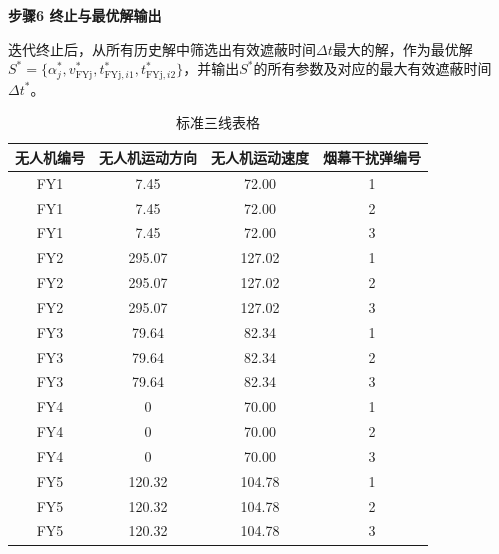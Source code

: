 \documentclass[../main.tex]{subfiles}
\begin{document}
\noindent\textbf{步骤6 终止与最优解输出}

迭代终止后，从所有历史解中筛选出有效遮蔽时间$\Delta t$最大的解，作为最优解$S^*=\{\alpha_j^*, v_{\text{FYj}}^*, t_{\text{FYj},i1}^*, t_{\text{FYj},i2}^*\}$，并输出$S^*$的所有参数及对应的最大有效遮蔽时间$\Delta t^*$。





\begin{table}[H]
\caption{标准三线表格}
\label{tab:001} 
\centering
\begin{small}
\begin{tabular}{cccc}
\toprule[1.5pt]
无人机编号 &无人机运动方向 & 无人机运动速度  &烟幕干扰弹编号     \\  
\midrule[1pt]
  FY1           &7.45                   & 72.00     & 1     \\               
   FY1          &7.45                  & 72.00     & 2      \\               
   FY1          &7.45                   & 72.00     & 3    \\                
  FY2           &295.07                   & 127.02     & 1      \\                
  FY2           &295.07                   & 127.02     & 2       \\               
  FY2           &295.07                   & 127.02    & 3     \\               
  FY3           & 79.64                  & 82.34     & 1       \\               
FY3             & 79.64                  & 82.34     & 2    \\                
FY3             & 79.64                  & 82.34    & 3      \\                
  FY4           &0                   & 70.00     & 1      \\                
  FY4           &0                   & 70.00     & 2       \\               
  FY4           &0                   & 70.00    & 3     \\               
  FY5          & 120.32                 & 104.78     & 1       \\               
FY5         & 120.32                 & 104.78    & 2    \\                
FY5          &120.32                  & 104.78     & 3      \\               
\bottomrule[1.5pt]
\end{tabular}
\end{small}
\end{table}
\end{document}
